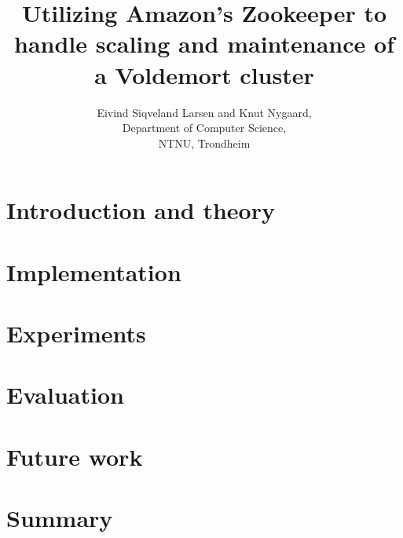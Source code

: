 \documentclass[a4paper, 12pt]{report}
\title{Utilizing Amazon's Zookeeper to handle scaling and maintenance of a Voldemort cluster}
\author{Eivind Siqveland Larsen and Knut Nygaard,\\
        Department of Computer Science,\\
        NTNU,
        Trondheim}
\begin{document}
\maketitle
\thispagestyle{empty}

\clearpage


\clearpage


\clearpage

\tableofcontents
\clearpage

\listoffigures
\clearpage
\setcounter{page}{1}

\chapter{Introduction and theory}


\clearpage


\clearpage


\clearpage


\clearpage


\clearpage


\clearpage


\clearpage

\chapter{Implementation}


\clearpage


\clearpage

\chapter{Experiments}



\chapter{Evaluation}


\chapter{Future work}


\chapter{Summary}





\end{document}
